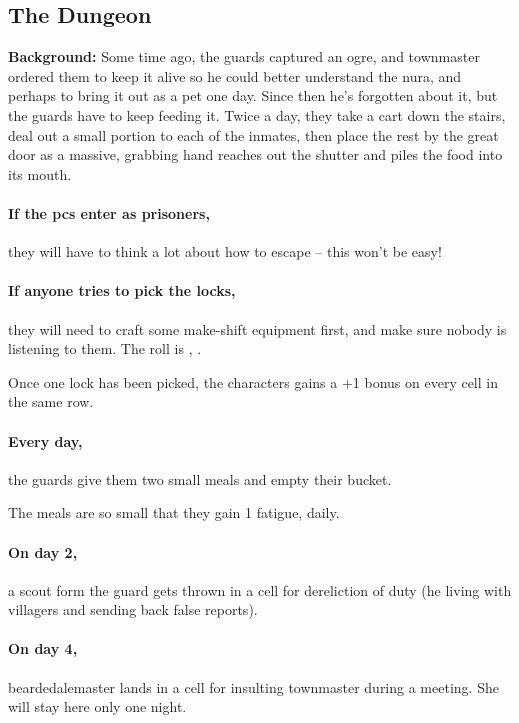 \subsection[the Dungeon]{The Dungeon}
\label{stationDungeon}

\textbf{Background:}
Some time ago, the guards captured an ogre, and \gls{townmaster} ordered them to keep it alive so he could better understand the nura, and perhaps to bring it out as a pet one day.  Since then he's forgotten about it, but the guards have to keep feeding it.  Twice a day, they take a cart down the stairs, deal out a small portion to each of the inmates, then place the rest by the great door as a massive, grabbing hand reaches out the shutter and piles the food into its mouth.

\paragraph{If the \glspl{pc} enter as prisoners,}
they will have to think a lot about how to escape -- this won't be easy!

\paragraph{If anyone tries to pick the locks,}
they will need to craft some make-shift equipment first, and make sure nobody is listening to them.
The roll is , \tn[12].

Once one lock has been picked, the characters gains a +1 bonus on every cell in the same row.

\paragraph{Every day,}
the guards give them two small meals and empty their bucket.

The meals are so small that they gain 1 \gls{fatigue}, daily.

\paragraph{On day 2,}
a scout form the \gls{guard} gets thrown in a cell for dereliction of duty (he living with villagers and sending back false reports).

\paragraph{On day 4,}
\gls{beardedalemaster} lands in a cell for insulting \gls{townmaster} during a meeting.
She will stay here only one night.

